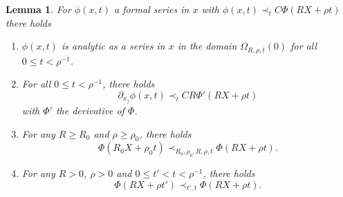\documentclass[10pt]{amsart}
\newtheorem{lemm}[cdrthm]{Lemma}
\theoremstyle{definition}
\theoremstyle{plain}
\newcommand{\dptl}{\partial}%
\begin{document}
\begin{lemm}\label{1.lemma.phi.prec.Phi}
For $\phi(x,t)$ a formal series in $x$ with $ \phi(x,t) \prec_{t} C\Phi(R X + \rho t) $ there holds
\begin{enumerate}
\item \label{lem4.4.1}$\phi(x,t)$ is analytic as a series in $x$ in the domain $\Omega_{R,\rho,t}(0)$ for all $0\leq t < \rho^{-1}$.

\item \label{lem4.4.2}For all $0\leq t < \rho^{-1}$, there holds
\begin{equation}\label{1.dx.Phi}
\dptl_{x_j} \phi(x,t) \prec_{t} CR \Phi'(R X + \rho t)
\end{equation}
with $\Phi'$ the derivative of $\Phi$.

\item \label{lem4.4.3}For any $R \geq R_0$ and $\rho \geq \rho_0$, there holds
\begin{equation}\label{1.R_0.R}
\Phi(R_0X+\rho_0 t) \prec_{R_0,\rho_0,R,\rho,t} \Phi(RX+\rho t).
\end{equation}

\item \label{lem4.4.4}For any $R>0$, $\rho>0$ and $0 \leq t' < t < \rho^{-1}$, there holds
\begin{equation}\label{1.t'.t}
\Phi(RX + \rho t') \prec_{t',t} \Phi(RX + \rho t).
\end{equation}
\end{enumerate}
\end{lemm}
\end{document}
